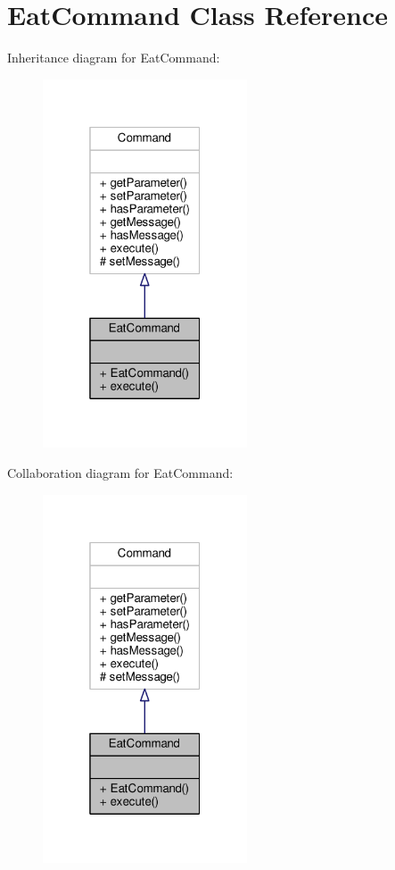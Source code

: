 \hypertarget{classEatCommand}{\section{Eat\-Command Class Reference}
\label{classEatCommand}
}


Inheritance diagram for Eat\-Command\-:
\nopagebreak
\begin{figure}[H]
\begin{center}
\leavevmode
\includegraphics[width=172pt]{classEatCommand__inherit__graph}
\end{center}
\end{figure}


Collaboration diagram for Eat\-Command\-:
\nopagebreak
\begin{figure}[H]
\begin{center}
\leavevmode
\includegraphics[width=172pt]{classEatCommand__coll__graph}
\end{center}
\end{figure}
